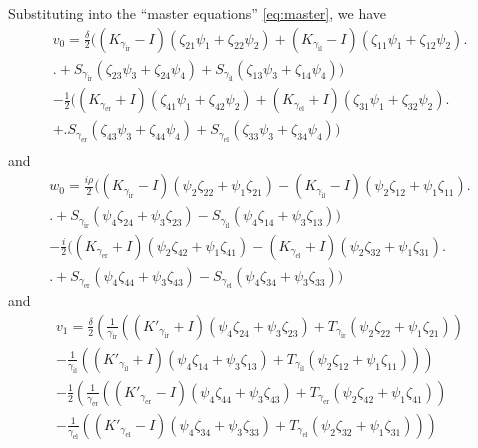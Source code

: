 Substituting into the ``master equations'' \eqref{eq:master}, we have
\begin{multline*}
  v_0 = \frac{\delta}{2}\bigl((K_{\gamma_\text{ir}}-I)(\zeta_{21}\psi_1 + \zeta_{22}\psi_2) + (K_{\gamma_\text{il}}-I)(\zeta_{11}\psi_1 + \zeta_{12}\psi_2)\bigr. \\
  \bigl. + S_{\gamma_\text{ir}} (\zeta_{23}\psi_3 + \zeta_{24}\psi_4)+S_{\gamma_\text{il}} (\zeta_{13}\psi_3 + \zeta_{14}\psi_4)\bigr) \\
  -\frac{1}{2}\bigl((K_{\gamma_\text{er}} + I)(\zeta_{41}\psi_1 + \zeta_{42}\psi_2) +(K_{\gamma_\text{el}} + I)(\zeta_{31}\psi_1 + \zeta_{32}\psi_2)\bigr. \\
  +\bigl. S_{\gamma_\text{er}} (\zeta_{43}\psi_3 + \zeta_{44}\psi_4)+S_{\gamma_\text{el}} (\zeta_{33}\psi_3 + \zeta_{34}\psi_4)\bigr) \\
\end{multline*}
and
\begin{multline*}
  w_0 = \frac{i \rho}{2} \bigl((K_{\gamma_\text{ir}}-I)(\psi_2 \zeta_{22}+\psi_1 \zeta_{21}) -(K_{\gamma_\text{il}}-I)(\psi_2 \zeta_{12}+\psi_1 \zeta_{11})\bigr. \\
  \bigl.+S_{\gamma_\text{ir}} (\psi_4 \zeta_{24}+\psi_3 \zeta_{23})-S_{\gamma_\text{il}} (\psi_4 \zeta_{14}+\psi_3 \zeta_{13})\bigr)\\
  -\frac{i}{2}\bigl((K_{\gamma_\text{er}} + I)(\psi_2 \zeta_{42}+\psi_1 \zeta_{41}) -(K_{\gamma_\text{el}} + I)(\psi_2 \zeta_{32}+\psi_1 \zeta_{31})\bigr.\\
  \bigl.+S_{\gamma_\text{er}} (\psi_4 \zeta_{44}+\psi_3 \zeta_{43})-S_{\gamma_\text{el}} (\psi_4 \zeta_{34}+\psi_3 \zeta_{33})\bigr) 
\end{multline*}
and
\begin{multline*}
  v_1 = \frac{\delta}{2}\left(\frac{1}{\gamma_\text{ir}}\left((K'_{\gamma_\text{ir}} + I)(\psi_4 \zeta_{24}+\psi_3 \zeta_{23}) + T_{\gamma_\text{ir}} (\psi_2 \zeta_{22}+\psi_1 \zeta_{21})\right)\right. \\
  \left.-\frac{1}{\gamma_\text{il}}\left((K'_{\gamma_\text{il}} + I)(\psi_4 \zeta_{14}+\psi_3 \zeta_{13}) +T_{\gamma_\text{il}} (\psi_2 \zeta_{12}+\psi_1 \zeta_{11})\right)\right) \\
  -\frac{1}{2}\left(\frac{1}{\gamma_\text{er}}\left((K'_{\gamma_\text{er}}-I)(\psi_4 \zeta_{44}+\psi_3 \zeta_{43}) +T_{\gamma_\text{er}} (\psi_2 \zeta_{42}+\psi_1 \zeta_{41})\right)\right.\\
  \left.-\frac{1}{\gamma_\text{el}}\left((K'_{\gamma_\text{el}}-I)(\psi_4 \zeta_{34}+\psi_3 \zeta_{33}) +T_{\gamma_\text{el}} (\psi_2 \zeta_{32}+\psi_1 \zeta_{31})\right)\right)
\end{multline*}
